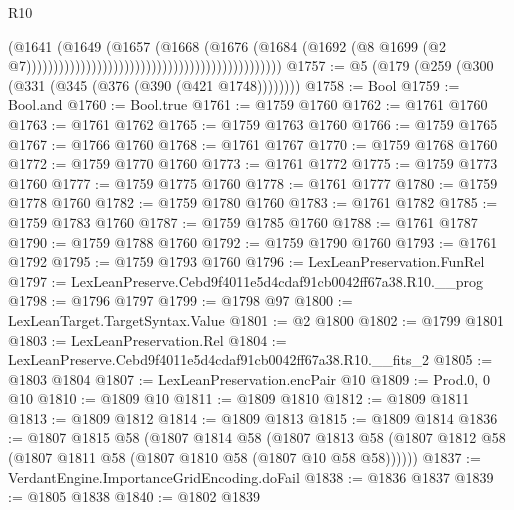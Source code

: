 \begin{lexlean}{R10}
\begin{coremodule}
                                                                                (@1641
                                                                                  (@1649
                                                                                    (@1657
                                                                                      (@1668
                                                                                        (@1676
                                                                                          (@1684
                                                                                            (@1692
                                                                                              (@8
                                                                                                @1699
                                                                                                (@2
                                                                                                  @7)))))))))))))))))))))))))))))))))))))))))))))))
@1757 := @5 (@179 (@259 (@300 (@331 (@345 (@376 (@390 (@421 @1748))))))))
@1758 := Bool
@1759 := Bool.and
@1760 := Bool.true
@1761 := @1759 @1760
@1762 := @1761 @1760
@1763 := @1761 @1762
@1765 := @1759 @1763 @1760
@1766 := @1759 @1765
@1767 := @1766 @1760
@1768 := @1761 @1767
@1770 := @1759 @1768 @1760
@1772 := @1759 @1770 @1760
@1773 := @1761 @1772
@1775 := @1759 @1773 @1760
@1777 := @1759 @1775 @1760
@1778 := @1761 @1777
@1780 := @1759 @1778 @1760
@1782 := @1759 @1780 @1760
@1783 := @1761 @1782
@1785 := @1759 @1783 @1760
@1787 := @1759 @1785 @1760
@1788 := @1761 @1787
@1790 := @1759 @1788 @1760
@1792 := @1759 @1790 @1760
@1793 := @1761 @1792
@1795 := @1759 @1793 @1760
@1796 := LexLeanPreservation.FunRel
@1797 := LexLeanPreserve.Cebd9f4011e5d4cdaf91cb0042ff67a38.R10.__prog
@1798 := @1796 @1797
@1799 := @1798 @97
@1800 := LexLeanTarget.TargetSyntax.Value
@1801 := @2 @1800
@1802 := @1799 @1801
@1803 := LexLeanPreservation.Rel
@1804 := LexLeanPreserve.Cebd9f4011e5d4cdaf91cb0042ff67a38.R10.__fits_2
@1805 := @1803 @1804
@1807 := LexLeanPreservation.encPair @10
@1809 := Prod.{0, 0} @10
@1810 := @1809 @10
@1811 := @1809 @1810
@1812 := @1809 @1811
@1813 := @1809 @1812
@1814 := @1809 @1813
@1815 := @1809 @1814
@1836 := @1807
    @1815
    @58
    (@1807
      @1814
      @58
      (@1807 @1813 @58 (@1807 @1812 @58 (@1807 @1811 @58 (@1807 @1810 @58 (@1807 @10 @58 @58))))))
@1837 := VerdantEngine.ImportanceGridEncoding.doFail
@1838 := @1836 @1837
@1839 := @1805 @1838
@1840 := @1802 @1839

\end{coremodule}
\end{lexlean}
